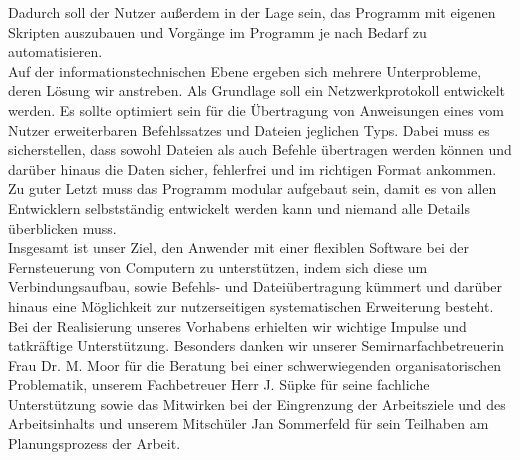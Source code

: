 Dadurch soll der Nutzer außerdem in der Lage sein, das Programm mit eigenen Skripten auszubauen und Vorgänge im Programm je nach Bedarf zu automatisieren.\\
Auf der informationstechnischen Ebene ergeben sich mehrere Unterprobleme, deren Lösung wir anstreben. Als Grundlage soll ein Netzwerkprotokoll entwickelt werden.
Es sollte optimiert sein für die Übertragung von Anweisungen eines vom Nutzer erweiterbaren Befehlssatzes und Dateien jeglichen Typs. Dabei muss es sicherstellen, dass sowohl Dateien als auch Befehle übertragen werden können und darüber hinaus die Daten sicher, fehlerfrei und im richtigen Format ankommen.\\
Zu guter Letzt muss das Programm modular aufgebaut sein, damit es von allen Entwicklern selbstständig entwickelt werden kann und niemand alle Details überblicken muss.\\
Insgesamt ist unser Ziel, den Anwender mit einer flexiblen Software bei der Fernsteuerung von Computern zu unterstützen, indem sich diese um Verbindungsaufbau, sowie Befehls- und Dateiübertragung kümmert und darüber hinaus eine Möglichkeit zur nutzerseitigen systematischen Erweiterung besteht.\\

Bei der Realisierung unseres Vorhabens erhielten wir wichtige Impulse und tatkräftige Unterstützung. Besonders danken wir unserer Semirnarfachbetreuerin Frau Dr. M. Moor für die Beratung bei einer schwerwiegenden organisatorischen Problematik, unserem Fachbetreuer Herr J. Süpke für seine fachliche Unterstützung sowie das Mitwirken bei der Eingrenzung der Arbeitsziele und des Arbeitsinhalts und unserem Mitschüler Jan Sommerfeld für sein Teilhaben am Planungsprozess der Arbeit.  
%